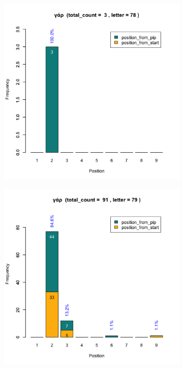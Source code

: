 \documentclass[a4paper]{article}
\begin{document}
\begin{figure}
\begin{subfigure}{0.45\textwidth}
\centering
\includegraphics[width=1\linewidth]{../../data/output/paul_R_par/plots/par1_lt78.png}
\end{subfigure}
\begin{subfigure}{0.45\textwidth}
\centering
\includegraphics[width=1\linewidth]{../../data/output/paul_R_par/plots/par1_lt79.png}
\end{subfigure}
\end{figure}
\end{document}
